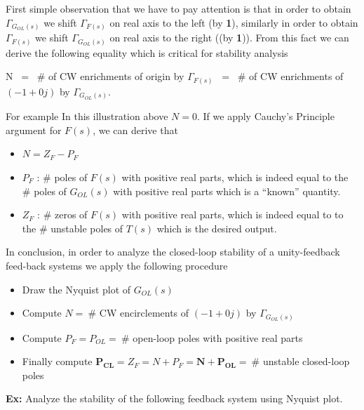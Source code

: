\documentclass[twoside]{article}
\begin{document}
\vspace{6 pt}

First simple observation that we have to pay attention is that in order to obtain $\Gamma_{G_{OL}(s)}$ we
shift $\Gamma_{F(s)}$ on real axis to the left (by \textbf{1}), similarly  in order to obtain $\Gamma_{F(s)}$ we
shift $\Gamma_{G_{OL}(s)}$ on real axis to the right ((by
\textbf{1})). From this fact we can derive the following equality
which is critical for stability analysis

\vspace{6 pt}

N $\ = \ $ $\#$ of CW enrichments of origin by  $\Gamma_{F(s)}$ $ \ =\ $ $\#$ of
CW enrichments of $(-1 + 0 j)$ by  $\Gamma_{G_{OL}(s)}$. 

\vspace{6 pt}

For example In this illustration above $N =0$. If we apply
Cauchy's Principle argument for $F(s)$, we can derive that
%
\begin{itemize}
  \item $N = Z_F - P_F$ 
%
  \item $P_{F}$ : $\#$ poles of $F(s)$ with positive real parts, which is
    indeed equal to the $\#$ poles of $G_{OL}(s)$ with positive real
    parts which is a ``known'' quantity. 
%
  \item $Z_F$ : $\#$ zeros of $F(s)$ with positive real parts, which is
    indeed equal to to the $\#$ unstable poles of $T(s)$ which is the
   desired output.
\end{itemize}

In conclusion, in order to analyze the closed-loop stability of a 
unity-feedback feed-back systems we apply the following 
procedure 

\begin{itemize}
 \item Draw the Nyquist plot of $G_{OL}(s)$
 \item Compute $N = \ \#$ CW encirclements of $(-1 + 0 j)$ by
   $\Gamma_{G_{OL}(s)}$ 
 \item Compute $P_{F} = P_{OL} = \ \#$ open-loop poles with
   positive real parts
 \item Finally compute $\mathbf{P_{CL}} = Z_{F} = N +  P_F = \mathbf{N +  P_{OL}} = \ \#$
   unstable closed-loop poles  
\end{itemize}

\newpage

\textbf{Ex:} Analyze the stability of the following feedback system
using Nyquist plot.
\end{document}
